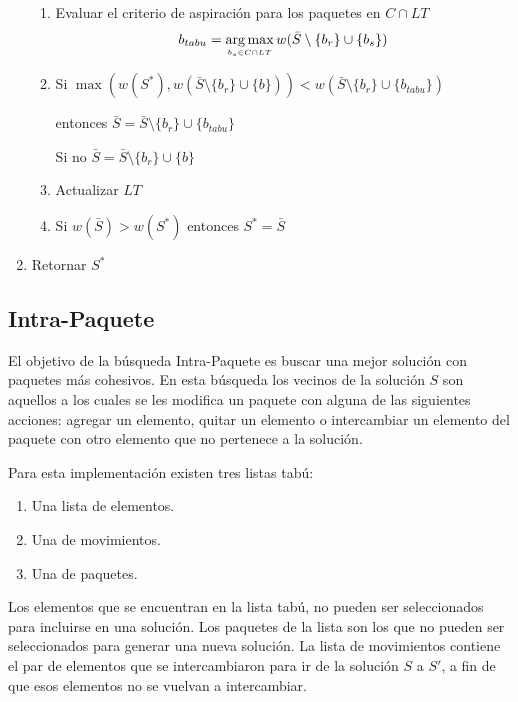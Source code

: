 \begin{enumerate}
\begin{enumerate}
\item Evaluar el criterio de aspiración para los paquetes en $C \cap LT$
\begin{align*}
b_{tabu} = \operatorname*{arg\,max}_{\scriptscriptstyle b_s \in C \cap LT} w(\bar{S} \setminus \{b_r\} \cup \{b_s\})
\end{align*}

\item Si $\max(w(S^*),w(\bar{S} \setminus \{b_r\} \cup \{b\})) < w(\bar{S} \setminus \{b_r\} \cup \{b_{tabu}\})$


entonces $\bar{S} = \bar{S} \setminus \{b_r\} \cup \{b_{tabu}\}$

Si no $\bar{S} = \bar{S} \setminus \{b_r\} \cup \{b\}$

\item Actualizar $LT$

\item Si $w(\bar{S})>w(S^*)$ entonces $S^*=\bar{S}$

\end{enumerate}

\item Retornar $S^*$

\end{enumerate}

\subsection{Intra-Paquete}
El objetivo de la búsqueda Intra-Paquete es buscar una mejor solución con paquetes más cohesivos. En esta búsqueda los vecinos de la solución $S$ son aquellos a los cuales se les modifica un paquete con alguna de las siguientes acciones: agregar un elemento, quitar un elemento o intercambiar un elemento del paquete con otro elemento que no pertenece a la solución. 

Para esta implementación existen tres listas tabú: 
\begin{enumerate}
	\item Una lista de elementos.
	\item Una de movimientos.
	\item Una de paquetes.
\end{enumerate}

Los elementos que se encuentran en la lista tabú, no pueden ser seleccionados para incluirse en una solución. Los paquetes de la lista son los que no pueden ser seleccionados para generar una nueva solución. La lista de movimientos contiene el par de elementos que se intercambiaron para ir de la solución $S$ a $S'$, a fin de que esos elementos no se vuelvan a intercambiar.

